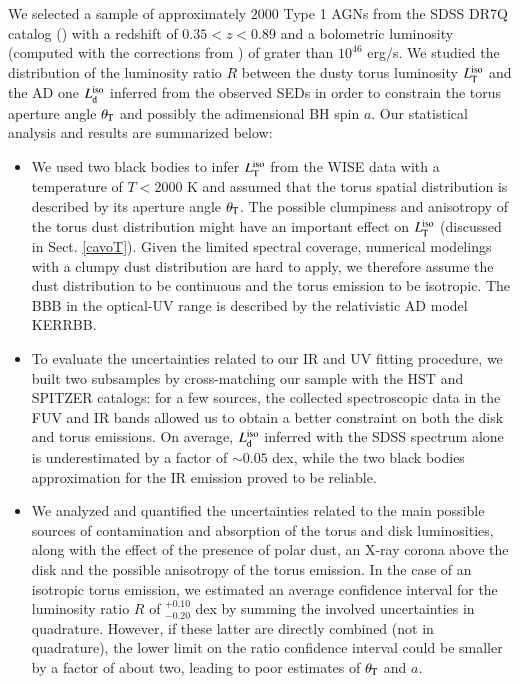 \documentclass[]{aa}
\begin{document}
We selected a sample of approximately $2000$ Type 1 AGNs from the SDSS DR7Q catalog (\citealt{Shenetal11}) with a redshift of $0.35<z<0.89$ and a bolometric luminosity (computed with the corrections from \citealt{Rich06}) of grater than $10^{46}$ erg/s. We studied the distribution of the luminosity ratio $R$ between the dusty torus luminosity $L^{\rm iso}_{\rm T}$ and the AD one $L^{\rm iso}_{\rm d}$ inferred from the observed SEDs in order to constrain the torus aperture angle $\theta_{\rm T}$ and possibly the adimensional BH spin $a$. Our statistical analysis and results are summarized below:
\begin{itemize}
    \item We used two black bodies to infer $L^{\rm iso}_{\rm T}$ from the WISE data with a temperature of $T < 2000$ K and assumed that the torus spatial distribution is described by its aperture angle $\theta_{\rm T}$. The possible clumpiness and anisotropy of the torus dust distribution might have an important effect on $L^{\rm iso}_{\rm T}$ (discussed in Sect. \ref{cavoT}). Given the limited spectral coverage, numerical modelings with a clumpy dust distribution are hard to apply, we therefore assume the dust distribution to be continuous and the torus emission to be isotropic. The BBB in the optical-UV range is described by the relativistic AD model KERRBB.

    \item To evaluate the uncertainties related to our IR and UV fitting procedure, we built two subsamples by cross-matching our sample with the HST and SPITZER catalogs: for a few sources, the collected spectroscopic data in the FUV and IR bands allowed us to obtain a better constraint on both the disk and torus emissions. On average, $L^{\rm iso}_{\rm d}$ inferred with the SDSS spectrum alone is underestimated by a factor of $\sim 0.05$ dex, while the two black bodies approximation for the IR emission proved to be reliable.

    \item We analyzed and quantified the uncertainties related to the main possible sources of contamination and absorption of the torus and disk luminosities, along with the effect of the presence of polar dust, an X-ray corona above the disk and the possible anisotropy of the torus emission. In the case of an isotropic torus emission, we estimated an average confidence interval for the luminosity ratio $R$ of $^{+0.10}_{-0.20}$ dex by summing the involved uncertainties in quadrature. However, if these latter are directly combined (not in quadrature), the lower limit on the ratio confidence interval could be smaller by a factor of about two, leading to poor estimates of $\theta_{\rm T}$ and $a$.
    

\end{itemize}
\end{document}
